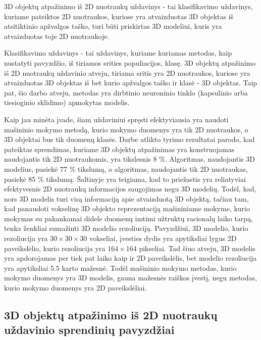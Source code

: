 
3D objektų atpažinimo iš 2D nuotraukų uždavinys - tai klasifikavimo uždavinys, kuriame pateiktos 2D nuotraukos, kuriose yra atvaizduotas 3D objektas iš atsitiktinio apžvalgos taško, turi būti priskirtas 3D modeliui, kuris yra atvaizduotas toje 2D nuotraukoje.

Klasifikavimo uždavinys - tai uždavinys, kuriame kuriamas metodas, kaip nustatyti pavyzdžio, iš tiriamos srities populiacijos, klasę. 3D objektų atpažinimo iš 2D nuotraukų uždavinio atveju, tiriama sritis yra 2D nuotraukos, kuriose yra atvaizduotas 3D objektas iš bet kurio apžvalgos taško ir klasė - 3D objektas. Taip pat, šio darbo atveju, metodas yra dirbtinio neuroninio tinklo (kapsulinio arba tiesioginio sklidimo) apmokytas modelis.

Kaip jau minėta įvade, šiam uždaviniui spręsti efektyviausia yra naudoti mašininio mokymo metodą, kurio mokymo duomenys yra tik 2D nuotraukos, o 3D objektai bus tik duomenų klasės. Darbe \cite{dbnExp} atlikto tyrimo rezultatai parodo, kad pateiktas sprendimas, kuriame 3D objektų atpažinimas yra konstruojamas naudojantis tik 2D nuotraukomis, yra tikslesnis 8 \%. Algoritmas, naudojantis 3D modelius, pasiekė 77 \% tikslumą, o algoritmas, naudojantis tik 2D nuotraukas, pasiekė 85 \% tikslumą. Šaltinyje \cite{cnnExp1} yra teigiama, kad to priežastis yra reliatyviai efektyvesnis 2D nuotraukų informacijos saugojimas negu 3D modelių. Todėl, kad, nors 3D modelis turi visą informaciją apie atvaizduotą 3D objektą, tačiau tam, kad panaudoti vokselinę 3D objekto reprezentaciją mašininiame mokyme, kurio mokymas su pakankamai didele duomenų imtimi užtruktų racionalų laiko tarpą, tenka ženkliai sumažinti 3D modelio rezoliuciją. Pavyzdžiui, 3D modelio, kurio rezoliucija yra $30\times30\times30$ vokseliai, įvesties dydis yra apytiksliai lygus 2D paveikslėlio, kurio rezoliucija yra $164\times164$ pikseliai. Tad šiuo atveju, 3D modelis yra apdorojamas per tiek pat laiko kaip ir 2D paveikslėlis, bet modelio rezoliucija yra apytiksliai 5.5 karto mažesnė. Todėl mašininio mokymo metodas, kurio mokymo duomenys yra 3D modelis, gauna mažesnės raiškos įvestį, negu metodas, kurio mokymo duomenys yra 2D paveikslėliai.

\subsection{3D objektų atpažinimo iš 2D nuotraukų uždavinio sprendinių pavyzdžiai}

